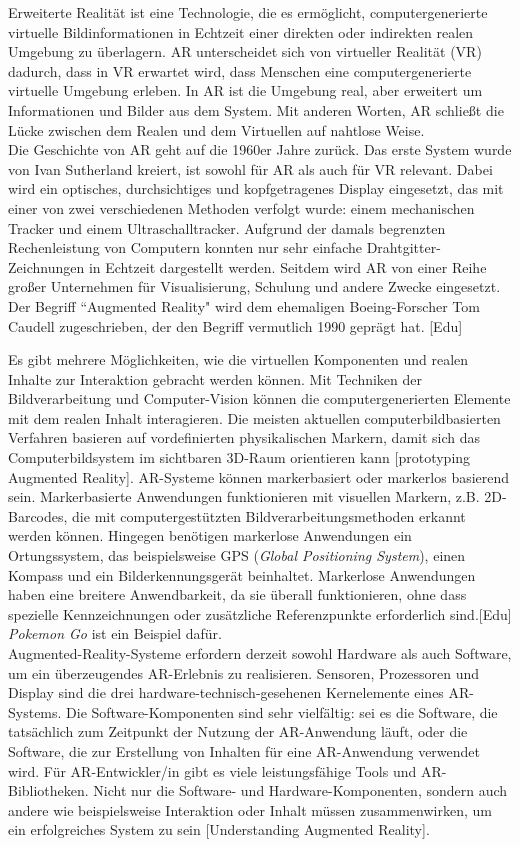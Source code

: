 \documentclass[deutsch]{llncs}
\begin{document}
Erweiterte Realität ist eine Technologie, die es ermöglicht, computergenerierte virtuelle Bildinformationen in Echtzeit einer direkten oder indirekten realen Umgebung zu überlagern. AR unterscheidet sich von virtueller Realität (VR) dadurch, dass in VR erwartet wird, dass Menschen eine computergenerierte virtuelle Umgebung erleben. In AR ist die Umgebung real, aber erweitert um Informationen und Bilder aus dem System. Mit anderen Worten, AR schließt die Lücke zwischen dem Realen und dem Virtuellen auf nahtlose Weise.\\
Die Geschichte von AR geht auf die 1960er Jahre zurück. Das erste System wurde von Ivan Sutherland kreiert, ist sowohl für AR als auch für VR relevant. Dabei wird ein optisches, durchsichtiges und kopfgetragenes Display eingesetzt, das mit einer von zwei verschiedenen Methoden verfolgt wurde: einem mechanischen Tracker und einem Ultraschalltracker. Aufgrund der damals begrenzten Rechenleistung von Computern konnten nur sehr einfache Drahtgitter-Zeichnungen in Echtzeit dargestellt werden. Seitdem wird AR von einer Reihe großer Unternehmen für Visualisierung, Schulung und andere Zwecke eingesetzt. Der Begriff ``Augmented Reality" wird dem ehemaligen Boeing-Forscher Tom Caudell zugeschrieben, der den Begriff vermutlich 1990 geprägt hat. [Edu]

Es gibt mehrere Möglichkeiten, wie die virtuellen Komponenten und realen Inhalte zur Interaktion gebracht werden können. Mit Techniken der Bildverarbeitung und Computer-Vision können die computergenerierten Elemente mit dem realen Inhalt interagieren. Die meisten aktuellen computerbildbasierten Verfahren basieren auf vordefinierten physikalischen Markern, damit sich das Computerbildsystem im sichtbaren 3D-Raum orientieren kann [prototyping Augmented Reality]. AR-Systeme können markerbasiert oder markerlos basierend sein. Markerbasierte Anwendungen funktionieren mit visuellen Markern, z.B. 2D-Barcodes, die mit computergestützten Bildverarbeitungsmethoden erkannt werden können. Hingegen benötigen markerlose Anwendungen ein Ortungssystem, das beispielsweise GPS (\emph{Global Positioning System}), einen Kompass und ein Bilderkennungsgerät beinhaltet. Markerlose Anwendungen haben eine breitere Anwendbarkeit, da sie überall funktionieren, ohne dass spezielle Kennzeichnungen oder zusätzliche Referenzpunkte erforderlich sind.[Edu] \emph{Pokemon Go} ist ein Beispiel dafür.\\
Augmented-Reality-Systeme erfordern derzeit sowohl Hardware als auch Software, um ein überzeugendes AR-Erlebnis zu realisieren. Sensoren, Prozessoren und Display sind die drei hardware-technisch-gesehenen Kernelemente eines AR-Systems. Die Software-Komponenten sind sehr vielfältig: sei es die Software, die tatsächlich zum Zeitpunkt der Nutzung der AR-Anwendung läuft, oder die Software, die zur Erstellung von Inhalten für eine AR-Anwendung verwendet wird. Für AR-Entwickler/in gibt es viele leistungsfähige Tools und AR-Bibliotheken. Nicht nur die Software- und Hardware-Komponenten, sondern auch andere wie beispielsweise Interaktion oder Inhalt müssen zusammenwirken, um ein erfolgreiches System zu sein [Understanding Augmented Reality].\\
\end{document}

